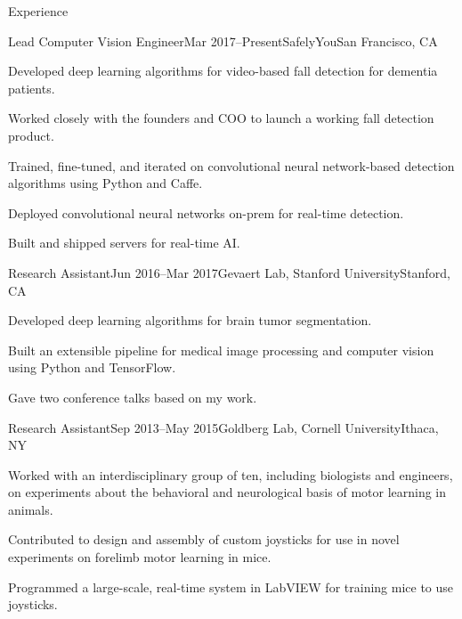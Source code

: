 \documentclass{resume}
\begin{document}
\begin{rSection}{Experience}

    \begin{rExperience}{Lead Computer Vision Engineer}{Mar 2017--Present}{SafelyYou}{San Francisco, CA}
        \item Developed deep learning algorithms for video-based fall detection for dementia patients.
        \item Worked closely with the founders and COO to launch a working fall detection product.
        \item Trained, fine-tuned, and iterated on convolutional neural network-based detection algorithms using Python and Caffe.
        \item Deployed convolutional neural networks on-prem for real-time detection.
        \item Built and shipped servers for real-time AI.
    \end{rExperience}
    
    \begin{rExperience}{Research Assistant}{Jun 2016--Mar 2017}{Gevaert Lab, Stanford University}{Stanford, CA}
        \item Developed deep learning algorithms for brain tumor segmentation.
        \item Built an extensible pipeline for medical image processing and computer vision using Python and TensorFlow.
        \item Gave two conference talks based on my work.
    \end{rExperience}


    \begin{rExperience}{Research Assistant}{Sep 2013--May 2015}{Goldberg Lab, Cornell University}{Ithaca, NY}
        \item Worked with an interdisciplinary group of ten, including biologists and engineers, on experiments about the behavioral and neurological basis of motor learning in animals.
        \item Contributed to design and assembly of custom joysticks for use in novel experiments on forelimb motor learning in mice.
        \item Programmed a large-scale, real-time system in LabVIEW for training mice to use joysticks.
    \end{rExperience}


\end{rSection}
\end{document}
